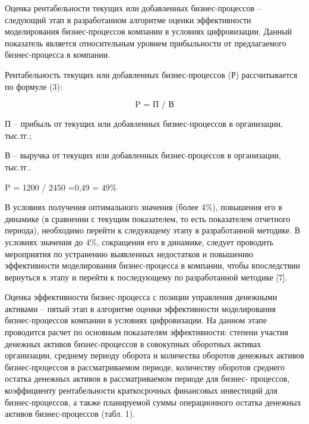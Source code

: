 \begin{multicols}{2}
Оценка рентабельности текущих или добавленных бизнес-процессов --
следующий этап в разработанном алгоритме оценки эффективности
моделирования бизнес-процессов компании в условиях цифровизации. Данный
показатель является относительным уровнем прибыльности от предлагаемого
бизнес-процесса в компании.

Рентабельность текущих или добавленных бизнес-процессов (Р)
рассчитывается по формуле (3):

\begin{equation}
\text{P = П / В}
\end{equation}

П -- прибыль от текущих или добавленных бизнес-процессов в организации,
тыс.тг.;

В -- выручка от текущих или добавленных бизнес-процессов в организации,
тыс.тг..
\begin{center}
P = 1200 / 2450 =0,49 = 49\%
\end{center}


В условиях получения оптимального значения (более 4\%), повышения его в
динамике (в сравнении с текущим показателем, то есть показателем
отчетного периода), необходимо перейти к следующему этапу в
разработанной методике. В условиях значения до 4\%, сокращения его в
динамике, следует проводить мероприятия по устранению выявленных
недостатков и повышению эффективности моделирования бизнес-процесса в
компании, чтобы впоследствии вернуться к этапу и перейти к последующему
по разработанной методике {[}7{]}.

Оценка эффективности бизнес-процесса с позиции управления денежными
активами -- пятый этап в алгоритме оценки эффективности моделирования
бизнес-процессов компании в условиях цифровизации. На данном этапе
проводится расчет по основным показателям эффективности: степени участия
денежных активов бизнес-процессов в совокупных оборотных активах
организации, среднему периоду оборота и количества оборотов денежных
активов бизнес-процессов в рассматриваемом периоде, количеству оборотов
среднего остатка денежных активов в рассматриваемом периоде для бизнес-
процессов, коэффициенту рентабельности краткосрочных финансовых
инвестиций для бизнес-процессов, а также планируемой суммы операционного
остатка денежных активов бизнес-процессов (табл. 1).
\end{multicols}

